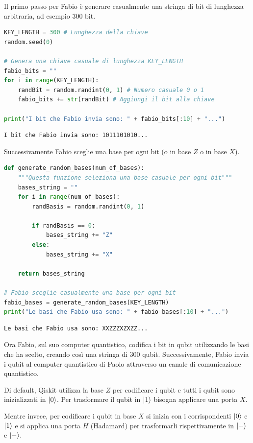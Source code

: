 \documentclass[a4paper]{article}
\begin{document}
Il primo passo per Fabio è generare casualmente una stringa di bit di lunghezza
arbitraria, ad esempio 300 bit.
\begin{lstlisting}[language=Python]
KEY_LENGTH = 300 # Lunghezza della chiave
random.seed(0)

# Genera una chiave casuale di lunghezza KEY_LENGTH
fabio_bits = ""
for i in range(KEY_LENGTH):
    randBit = random.randint(0, 1) # Numero casuale 0 o 1
    fabio_bits += str(randBit) # Aggiungi il bit alla chiave
    
print("I bit che Fabio invia sono: " + fabio_bits[:10] + "...")
\end{lstlisting}
\begin{lstlisting}
I bit che Fabio invia sono: 1011101010...
\end{lstlisting}
Successivamente Fabio sceglie una base per ogni bit (o in base \( Z \) o in base \( X \)).
\begin{lstlisting}[language=Python]
def generate_random_bases(num_of_bases):
    """Questa funzione seleziona una base casuale per ogni bit"""
    bases_string = ""
    for i in range(num_of_bases):
        randBasis = random.randint(0, 1)

        if randBasis == 0:
            bases_string += "Z" 
        else:
            bases_string += "X"
            
    return bases_string

# Fabio sceglie casualmente una base per ogni bit
fabio_bases = generate_random_bases(KEY_LENGTH)
print("Le basi che Fabio usa sono: " + fabio_bases[:10] + "...")
\end{lstlisting}
\begin{lstlisting}
Le basi che Fabio usa sono: XXZZZXZXZZ...
\end{lstlisting}
Ora Fabio, sul suo computer quantistico, codifica i bit in qubit utilizzando le basi
che ha scelto, creando così una stringa di 300 qubit. Successivamente, Fabio invia i
qubit al computer quantistico di Paolo attraverso un canale di comunicazione
quantistico.

Di default, Qiskit utilizza la base \( Z \) per codificare i qubit e tutti i qubit sono
inizializzati in $\ket{0}$. Per trasformare il qubit in $\ket{1}$ bisogna applicare
una porta \( X \).

Mentre invece, per codificare i qubit in base \( X \) si inizia con i corrispondenti
$\ket{0}$ e $\ket{1}$ e si applica una porta \( H \) (Hadamard) per trasformarli rispettivamente
in $\ket{+}$ e $\ket{-}$.
\end{document}
